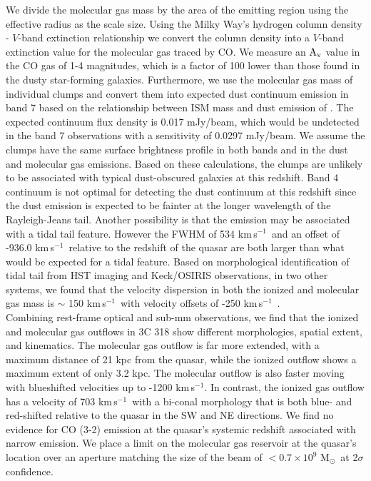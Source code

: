 \documentclass[twocolumn]{aastex63}
\newcommand{\msun}{M$_{\odot}$}
\newcommand{\kms}{km\,s$^{-1}$}
\begin{document}
We divide the molecular gas mass by the area of the emitting region using the effective radius as the scale size. Using the Milky Way's hydrogen column density - $V$-band extinction relationship \citep{Guver09} we convert the column density into a $V$-band extinction value for the molecular gas traced by CO. We measure an $\rm A_{v}$ value in the CO gas of 1-4 magnitudes, which is a factor of 100 lower than those found in the dusty star-forming galaxies. Furthermore, we use the molecular gas mass of individual clumps and convert them into expected dust continuum emission in band 7 based on the relationship between ISM mass and dust emission of \citet{Scoville17}. The expected continuum flux density is 0.017 mJy/beam, which would be undetected in the band 7 observations with a sensitivity of 0.0297 mJy/beam. We assume the clumps have the same surface brightness profile in both bands and in the dust and molecular gas emissions. Based on these calculations, the clumps are unlikely to be associated with typical dust-obscured galaxies at this redshift. Band 4 continuum is not optimal for detecting the dust continuum at this redshift since the dust emission is expected to be fainter at the longer wavelength of the Rayleigh-Jeans tail. Another possibility is that the emission may be associated with a tidal tail feature. However the FWHM of 534 \kms\ and an offset of -936.0 \kms\ relative to the redshift of the quasar are both larger than what would be expected for a tidal feature. Based on morphological identification of tidal tail from HST imaging and Keck/OSIRIS observations, in two other systems, we found that the velocity dispersion in both the ionized and molecular gas mass is $\sim$ 150 \kms\ with velocity offsets of -250 \kms\ \citep{Vayner19b}. \\

Combining rest-frame optical and sub-mm observations, we find that the ionized and molecular gas outflows in 3C 318 show different morphologies, spatial extent, and kinematics. The molecular gas outflow is far more extended, with a maximum distance of 21 kpc from the quasar, while the ionized outflow shows a maximum extent of only 3.2 kpc. The molecular outflow is also faster moving with blueshifted velocities up to -1200 \kms. In contrast, the ionized gas outflow has a velocity of 703 \kms\ with a bi-conal morphology that is both blue- and red-shifted relative to the quasar in the SW and NE directions. We find no evidence for CO (3-2) emission at the quasar's systemic redshift associated with narrow emission. We place a limit on the molecular gas reservoir at the quasar's location over an aperture matching the size of the beam of $<0.7\times10^{9}$ \msun\ at 2$\sigma$ confidence.\\
\end{document}
